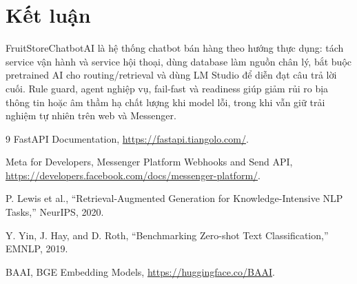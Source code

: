 \documentclass[10pt,a4paper,twocolumn]{article}
\begin{document}
\section{Kết luận}
FruitStoreChatbotAI là hệ thống chatbot bán hàng theo hướng thực dụng: tách service vận hành và service hội thoại, dùng database làm nguồn chân lý, bắt buộc pretrained AI cho routing/retrieval và dùng LM Studio để diễn đạt câu trả lời cuối. Rule guard, agent nghiệp vụ, fail-fast và readiness giúp giảm rủi ro bịa thông tin hoặc âm thầm hạ chất lượng khi model lỗi, trong khi vẫn giữ trải nghiệm tự nhiên trên web và Messenger.

\begin{thebibliography}{9}
\footnotesize
{}
FastAPI Documentation, \url{https://fastapi.tiangolo.com/}.

Meta for Developers, Messenger Platform Webhooks and Send API, \url{https://developers.facebook.com/docs/messenger-platform/}.

P. Lewis et al., ``Retrieval-Augmented Generation for Knowledge-Intensive NLP Tasks,'' NeurIPS, 2020.

Y. Yin, J. Hay, and D. Roth, ``Benchmarking Zero-shot Text Classification,'' EMNLP, 2019.

BAAI, BGE Embedding Models, \url{https://huggingface.co/BAAI}.
\end{thebibliography}
\end{document}
